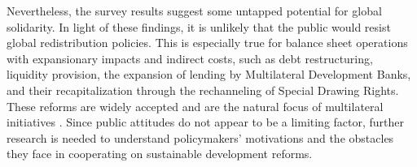 \documentclass[12pt,english]{article}
\begin{document}
\begin{bibunit}
Nevertheless, the survey results %
suggest some untapped potential for global solidarity. In light of these findings, it is unlikely that the public would resist global redistribution policies. This is especially true for balance sheet operations with expansionary impacts and indirect costs, such as debt restructuring, liquidity provision, %
the expansion of lending by Multilateral Development Banks, and their recapitalization through the rechanneling of Special Drawing Rights. These reforms are widely accepted and are the natural focus of multilateral initiatives \citep{bridgetown_initiative_bridgetown_2025,ffd4_outcome_2025}. %
Since public attitudes do not appear to be a limiting factor, further research is needed to understand policymakers' motivations and the obstacles they face in cooperating on sustainable development reforms. 




\end{bibunit}
\end{document}
